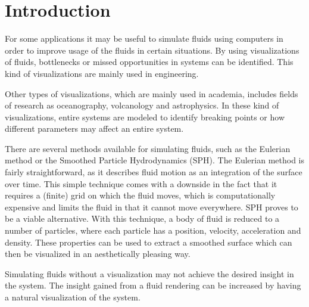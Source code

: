 \section{Introduction}

For some applications it may be useful to simulate fluids using computers in order to improve usage of the fluids in certain situations.
By using visualizations of fluids, bottlenecks or missed opportunities in systems can be identified.
This kind of visualizations are mainly used in engineering.

Other types of visualizations, which are mainly used in academia, includes fields of research as oceanography, volcanology and astrophysics. 
In these kind of visualizations, entire systems are modeled to identify breaking points or how different parameters may affect an entire system.

There are several methods available for simulating fluids, such as the Eulerian method or the Smoothed Particle Hydrodynamics (SPH). The Eulerian method is fairly straightforward, as it describes fluid motion as an integration of the surface over time. 
This simple technique comes with a downside in the fact that it requires a (finite) grid on which the fluid moves, which is computationally expensive and limits the fluid in that it cannot move everywhere.
SPH proves to be a viable alternative. 
With this technique, a body of fluid is reduced to a number of particles, where each particle has a position, velocity, acceleration and density.
These properties can be used to extract a smoothed surface which can then be visualized in an aesthetically pleasing way. 	

Simulating fluids without a visualization may not achieve the desired insight in the system. 
The insight gained from a fluid rendering can be increased by having a natural visualization of the system. 
